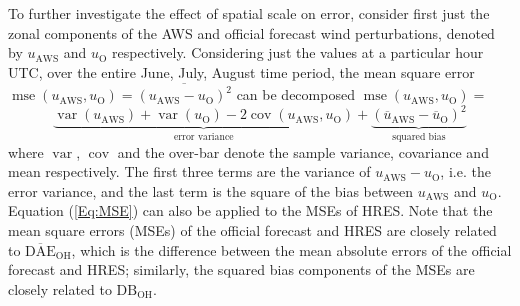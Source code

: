 \documentclass{ametsoc}
\DeclareMathOperator{\mse}{mse}
\DeclareMathOperator{\cov}{cov}
\DeclareMathOperator{\var}{var}
\begin{document}
To further investigate the effect of spatial scale on error, consider first just the zonal components of the AWS and official forecast wind perturbations, denoted by $u_\text{AWS}$ and $u_\text{O}$ respectively. Considering just the values at a particular hour UTC, over the entire June, July, August time period, the mean square error $\mse\left(u_\text{AWS}, u_\text{O}\right) = \overline{\left(u_\text{AWS} - u_\text{O}\right)^2}$ can be decomposed $\mse\left(u_\text{AWS}, u_\text{O}\right)=$ 
\begin{equation}
\underbrace{\var\left(u_\text{AWS}\right) + \var\left(u_\text{O}\right) - 2\cov\left(u_\text{AWS}, u_\text{O}\right)}_\text{error variance} + \underbrace{\left(\overline{u}_\text{AWS} - \overline{u}_\text{O}\right)^2}_{\text{squared bias}} \label{Eq:MSE}
\end{equation}
where $\var$, $\cov$ and the over-bar denote the sample variance, covariance and mean respectively. The first three terms are the variance of $u_\text{AWS} - u_\text{O}$, i.e. the error variance, and the last term is the square of the bias between $u_\text{AWS}$ and $u_\text{O}$. Equation (\ref{Eq:MSE}) can also be applied to the MSEs of HRES. Note that the mean square errors (MSEs) of the official forecast and HRES are closely related to $\overline{\text{DAE}}_\text{OH}$, which is the difference between the mean absolute errors of the official forecast and HRES; similarly, the squared bias components of the MSEs are closely related to $\text{DB}_\text{OH}$. 
\end{document}
